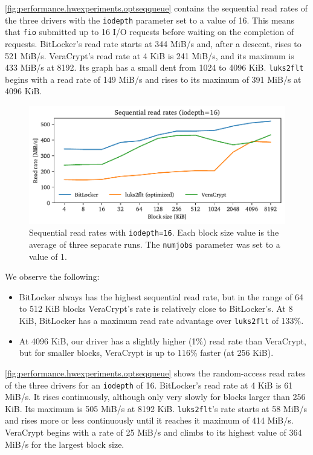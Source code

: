 \autoref{fig:performance.hwexperiments.optseqqueue} contains the sequential read rates of the three drivers with the \texttt{iodepth} parameter set to a value of 16. This means that \texttt{fio} submitted up to 16 I/O requests before waiting on the completion of requests. BitLocker's read rate starts at 344 MiB/s and, after a descent, rises to 521 MiB/s. VeraCrypt's read rate at 4 KiB is 241 MiB/s, and its maximum is 433 MiB/s at 8192. Its graph has a small dent from 1024 to 4096 KiB. \texttt{luks2flt} begins with a read rate of 149 MiB/s and rises to its maximum of 391 MiB/s at 4096 KiB.

\begin{figure}[htb!]
	\center
	\includegraphics[scale=1]{../fig/performance.hwexperiments.optseqqueue.pdf}
	\caption[
		Sequential read rates with \texttt{iodepth=16}
	]{
		Sequential read rates with \texttt{iodepth=16}. Each block size value is the average of three separate runs. The \texttt{numjobs} parameter was set to a value of 1.
	}
	\label{fig:performance.hwexperiments.optseqqueue}
\end{figure}

We observe the following:
\begin{itemize}
	\item BitLocker always has the highest sequential read rate, but in the range of 64 to 512 KiB blocks VeraCrypt's rate is relatively close to BitLocker's. At 8 KiB, BitLocker has a maximum read rate advantage over \texttt{luks2flt} of 133\%.
	\item At 4096 KiB, our driver has a slightly higher (1\%) read rate than VeraCrypt, but for smaller blocks, VeraCrypt is up to 116\% faster (at 256 KiB).
\end{itemize}

\autoref{fig:performance.hwexperiments.optseqqueue} shows the random-access read rates of the three drivers for an \texttt{iodepth} of 16. BitLocker's read rate at 4 KiB is 61 MiB/s. It rises continuously, although only very slowly for blocks larger than 256 KiB. Its maximum is 505 MiB/s at 8192 KiB. \texttt{luks2flt}'s rate starts at 58 MiB/s and rises more or less continuously until it reaches it maximum of 414 MiB/s. VeraCrypt begins with a rate of 25 MiB/s and climbs to its highest value of 364 MiB/s for the largest block size.

